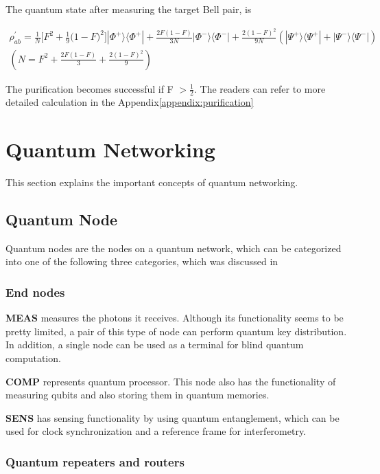 The quantum state after measuring the target Bell pair, is

\begin{align}
\rho^{'}_{ab} = \frac{1}{N} \big[ F^2 + \frac{1}{9}\big(1-F \big)^2\big]|\Phi^+\rangle\langle\Phi^+| + \frac{2F(1-F)}{3N}|\Phi^-\rangle\langle\Phi^-| + \frac{2(1-F)^2}{9N}(|\Psi^+\rangle\langle\Psi^+| + |\Psi^-\rangle\langle\Psi^-|) \nonumber\\
(N = F^2 + \frac{2F(1-F)}{3} + \frac{2(1-F)^2}{9})
\end{align}

The purification becomes successful if F  $> \frac{1}{2}$. The readers can refer to more detailed calculation in the Appendix\ref{appendix:purification}

\section{Quantum Networking}

This section explains the important concepts of quantum networking.

\subsection{Quantum Node}

Quantum nodes are the nodes on a quantum network, which can be categorized into one of the following three categories, which was discussed in \cite{van2022quantum}

\subsubsection{End nodes}

\textbf{MEAS} measures the photons it receives. Although its functionality seems to be pretty limited, a pair of this type of node can perform quantum key distribution. In addition, a single node can be used as a terminal for blind quantum computation.

\textbf{COMP} represents quantum processor.  This node also has the functionality of measuring qubits and also storing them in quantum memories.

\textbf{SENS} has sensing functionality by using quantum entanglement, which can be used for clock synchronization and a reference frame for interferometry. 

\subsubsection{Quantum repeaters and routers}

